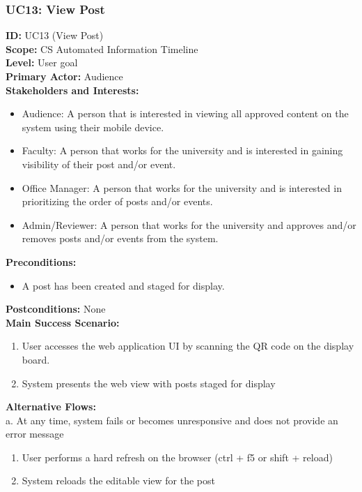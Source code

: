\documentclass{article}
\begin{document}
\subsubsection{UC13: View Post}
\textbf{ID:} UC13 (View Post) \\
\textbf{Scope:} CS Automated Information Timeline \\
\textbf{Level:} User goal \\
\textbf{Primary Actor:} Audience \\
\textbf{Stakeholders and Interests: }
\begin{itemize}
    \item Audience: A person that is interested in viewing all approved content on the system using their mobile device.
    \item Faculty: A person that works for the university and is interested in gaining visibility of their post and/or event.
    \item Office Manager: A person that works for the university and is interested in prioritizing the order of posts and/or events.
    \item Admin/Reviewer: A person that works for the university and approves and/or removes posts and/or events from the system.
\end{itemize}
\textbf{Preconditions: }
\begin{itemize}
    \item A post has been created and staged for display.
\end{itemize}
\textbf{Postconditions:} None \\
\textbf{Main Success Scenario: }
\begin{enumerate}
    \item User accesses the web application UI by scanning the QR code on the display board.
    \item System presents the web view with posts staged for display
\end{enumerate}
\textbf{Alternative Flows: } \\
a. At any time, system fails or becomes unresponsive and does not provide an error message
\begin{enumerate}
    \item User performs a hard refresh on the browser (ctrl + f5 or shift + reload)
    \item System reloads the editable view for the post
\end{enumerate}
\end{document}

